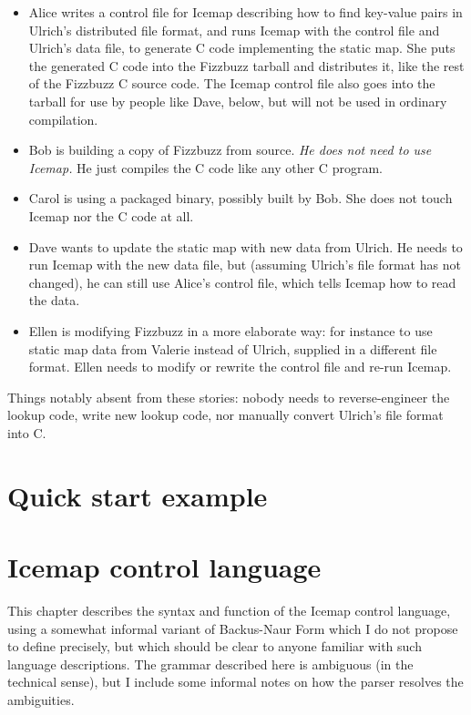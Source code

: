 \documentclass{mitsuba}
\begin{document}
\begin{itemize}
  \item Alice writes a control file for Icemap describing how to find
    key-value pairs in Ulrich's distributed file format, and runs Icemap with
    the control file and Ulrich's data file, to generate C code implementing
    the static map.  She puts the generated C code into the Fizzbuzz tarball
    and distributes it, like the rest of the Fizzbuzz C source code. 
    The Icemap control file also goes into the tarball for use by people
    like Dave, below, but will not be used in ordinary compilation.
  \item Bob is building a copy of Fizzbuzz from source.  \emph{He
    does not need to use Icemap.}  He just compiles the C code like any
    other C program.
  \item Carol is using a packaged binary, possibly built by Bob.  She does
    not touch Icemap nor the C code at all.
  \item Dave wants to update the static map with new data from Ulrich.  He
    needs to run Icemap with the new data file, but (assuming Ulrich's file
    format has not changed), he can still use Alice's control file, which
    tells Icemap how to read the data.
  \item Ellen is modifying Fizzbuzz in a more elaborate way:  for instance
    to use static map data from Valerie instead of Ulrich, supplied in a
    different file format.  Ellen needs to modify or rewrite the control
    file and re-run Icemap.
\end{itemize}

Things notably absent from these stories:  nobody needs to reverse-engineer
the lookup code, write new lookup code, nor manually convert Ulrich's file
format into C.


\chapter{Quick start example}


\chapter{Icemap control language}

This chapter describes the syntax and function of the Icemap control
language, using a somewhat informal variant of Backus-Naur Form which I do
not propose to define precisely, but which should be clear to anyone
familiar with such language descriptions.  The grammar described here is
ambiguous (in the technical sense), but I include some informal notes on
how the parser resolves the ambiguities.
\end{document}
